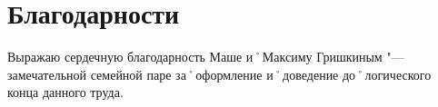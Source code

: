 ﻿\chapter{Благодарности}
Выражаю сердечную благодарность Маше и˚Максиму Гришкиным "--- замечательной семейной паре за˚оформление и˚доведение до˚логического конца данного труда.